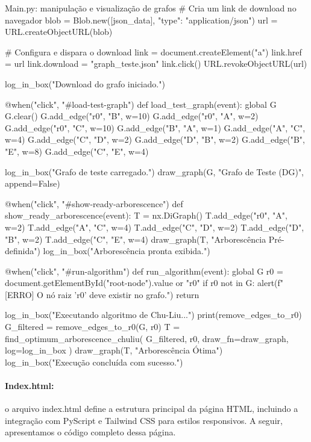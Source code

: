 \documentclass[12pt,a4paper]{article}
\def\texttt#1{#1}%
\begin{document}
\begin{pybox}[label={lst:draw_graph}]{Main.py: manipulação e visualização de grafos}
    # Cria um link de download no navegador
    blob = Blob.new([json_data], {"type": "application/json"})
    url = URL.createObjectURL(blob)

    # Configura e dispara o download
    link = document.createElement("a")
    link.href = url
    link.download = "graph_teste.json"
    link.click()
    URL.revokeObjectURL(url)

    log_in_box("Download do grafo iniciado.")

@when("click", "#load-test-graph")
def load_test_graph(event):
    global G
    G.clear()
    G.add_edge("r0", "B", w=10)
    G.add_edge("r0", "A", w=2)
    G.add_edge("r0", "C", w=10)
    G.add_edge("B", "A", w=1)
    G.add_edge("A", "C", w=4)
    G.add_edge("C", "D", w=2)
    G.add_edge("D", "B", w=2)
    G.add_edge("B", "E", w=8)
    G.add_edge("C", "E", w=4)

    log_in_box("Grafo de teste carregado.")
    draw_graph(G, "Grafo de Teste (DG)", append=False)

@when("click", "#show-ready-arborescence")
def show_ready_arborescence(event):
    T = nx.DiGraph()
    T.add_edge("r0", "A", w=2)
    T.add_edge("A", "C", w=4)
    T.add_edge("C", "D", w=2)
    T.add_edge("D", "B", w=2)
    T.add_edge("C", "E", w=4)
    draw_graph(T, "Arborescência Pré-definida")
    log_in_box("Arborescência pronta exibida.")


@when("click", "#run-algorithm")
def run_algorithm(event):
    global G
    r0 = document.getElementById("root-node").value or "r0"
    if r0 not in G:
        alert(f"[ERRO] O nó raiz '{r0}' deve existir no grafo.")
        return

    log_in_box("Executando algoritmo de Chu-Liu...")
    print(remove_edges_to_r0)
    G_filtered = remove_edges_to_r0(G, r0)
    T = find_optimum_arborescence_chuliu(
        G_filtered, r0, draw_fn=draw_graph, log=log_in_box
    )
    draw_graph(T, "Arborescência Ótima")
    log_in_box("Execução concluída com sucesso.")
\end{pybox}

\paragraph{\texttt{Index.html}:} o arquivo \texttt{index.html} define a estrutura principal da página HTML, incluindo a integração com PyScript e Tailwind CSS para estilos responsivos. A seguir, apresentamos o código completo dessa página.
\end{document}
